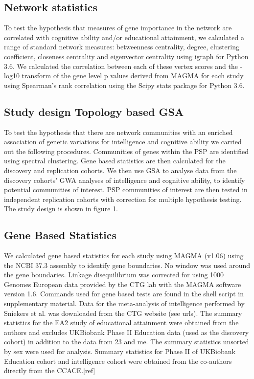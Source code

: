 \subsection{Network statistics}
To test the hypothesis that measures of gene importance in the network are correlated with cognitive ability and/or educational attainment, we calculated a range of standard network measures: betweenness centrality, degree, clustering coefficient, closeness centrality and eigenvector centrality using igraph for Python 3.6. \cite{csardi2006igraph}  We calculated the correlation between each of these vertex scores and the -log10 transform of the gene level p values derived from MAGMA for each study using Spearman’s rank correlation using the Scipy stats package for Python 3.6. 
\subsection{Study design Topology based GSA}
To test the hypothesis that there are network communities with an enriched association of genetic variations for intelligence and cognitive ability we carried out the following procedures.
Communities of genes within the PSP are identified using spectral clustering. Gene based statistics are then calculated for the discovery and replication cohorts. We then use GSA to analyse data from the discovery cohorts’ GWA analyses of intelligence and cognitive ability, to identify potential communities of interest. PSP communities of interest are then tested in independent replication cohorts with correction for multiple hypothesis testing. The study design is shown in figure 1.

\subsection{Gene Based Statistics}
We calculated gene based statistics for each study using MAGMA (v1.06) using the NCBI 37.3 assembly to identify gene boundaries. \cite{de2015magma}   No window was used around the gene boundaries. Linkage disequilibrium was corrected for using 1000 Genomes European data provided by the CTG lab with the MAGMA software version 1.6.\cite{de2015magma}  Commands used for gene based tests are found in the shell script in supplementary material. Data for the meta-analysis of intelligence performed by Sniekers  et al. was downloaded from the CTG website (see urls). \cite{sniekers2017genome}  The summary statistics for the EA2 study of educational attainment were obtained from the authors and excludes UKBiobank Phase II Education data (used as the discovery cohort) in addition to the data from 23 and me. \cite{okbay2016genome}  The summary statistics unsorted by sex were used for analysis. Summary statistics for Phase II of UKBiobank Education cohort and intelligence cohort were obtained from the co-authors directly from the CCACE.[ref]

